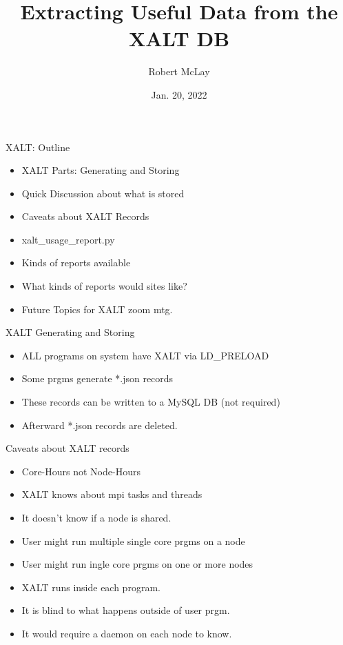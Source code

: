 \documentclass{beamer}
\begin{document}
\title[XALT]{Extracting Useful Data from the XALT DB}
\author{Robert McLay} 
\date{Jan. 20, 2022} 

\frame{\titlepage} 

\begin{frame}{XALT: Outline}
  \begin{itemize}
    \item XALT Parts: Generating and Storing
    \item Quick Discussion about what is stored
    \item Caveats about XALT Records
    \item xalt\_usage\_report.py
    \item Kinds of reports available
    \item What kinds of reports would sites like?
    \item Future Topics for XALT zoom mtg.
  \end{itemize}
\end{frame}

\begin{frame}{XALT Generating and Storing}
  \begin{itemize}
    \item ALL programs on system have XALT via LD\_PRELOAD
    \item Some prgms generate *.json records
    \item These records can be written to a MySQL DB (not required) 
    \item Afterward *.json records are deleted.
  \end{itemize}
\end{frame}

\begin{frame}{Caveats about XALT records}
  \begin{itemize}
    \item Core-Hours not Node-Hours 
    \item XALT knows about mpi tasks and threads
    \item It doesn't know if a node is shared.
    \item User might run multiple single core prgms on a node
    \item User might run ingle core prgms on one or more nodes
    \item XALT runs inside each program.
    \item It is blind to what happens outside of user prgm.
    \item It would require a daemon on each node to know.
  \end{itemize}
\end{frame}
\end{document}
